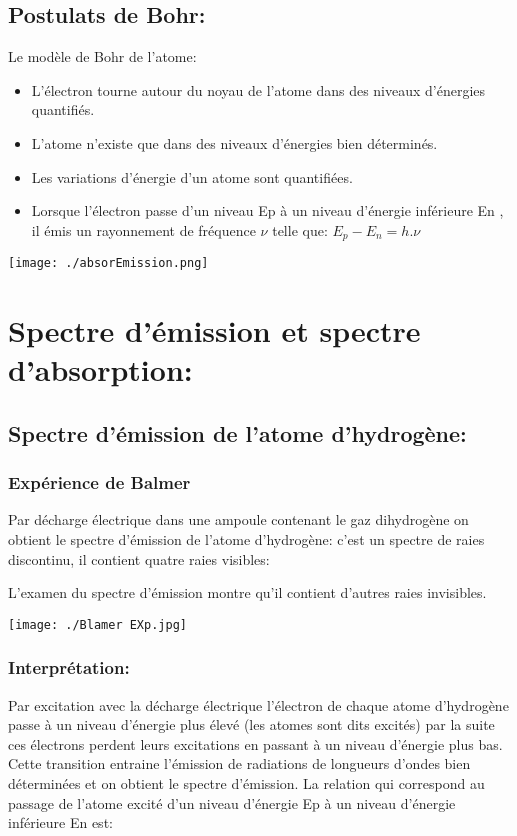 \documentclass[12pt]{article}
\begin{document}
\subsection{Postulats de Bohr: }
Le modèle de Bohr de l'atome:
\begin{itemize}
	\item L'électron tourne autour du noyau de l'atome dans des niveaux d'énergies quantifiés.
	\item L'atome n'existe que dans des niveaux d'énergies bien déterminés.
	\item Les variations d'énergie d'un atome sont quantifiées.
\item Lorsque l'électron passe d'un niveau Ep à un niveau d'énergie inférieure En , il émis un rayonnement de fréquence $\nu$ telle que: $E_p - E_n = h.\nu$




\end{itemize}
\begin{center}

	\texttt{[image: ./absorEmission.png]}
\end{center}
\section{Spectre d'émission et spectre d'absorption:}


\subsection{Spectre d'émission de l'atome d'hydrogène:}

\subsubsection{  Expérience de Balmer}

Par décharge électrique dans une ampoule contenant le gaz dihydrogène on obtient le spectre d'émission de l'atome d'hydrogène:
c'est un spectre de raies discontinu, il contient quatre raies visibles:

L'examen du spectre d'émission montre qu'il contient d'autres raies invisibles.

\begin{center}

	\texttt{[image: ./Blamer EXp.jpg]}
\end{center}


\subsubsection{Interprétation:}
Par excitation avec la décharge électrique l'électron de chaque atome d'hydrogène passe à un niveau d'énergie plus élevé (les
atomes sont dits excités) par la suite ces électrons perdent leurs excitations en passant à un niveau d'énergie plus bas. Cette
transition entraine l'émission de radiations de longueurs d'ondes bien déterminées et on obtient le spectre d'émission.
La relation qui correspond au passage de l'atome excité d'un niveau d'énergie Ep à un niveau d'énergie inférieure En est:
\end{document}
